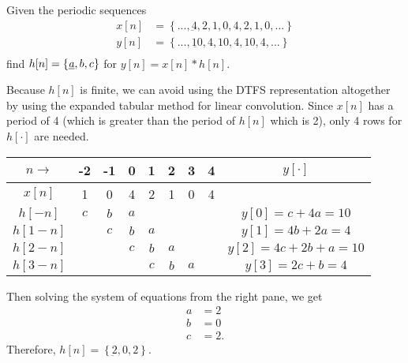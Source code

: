 \documentclass{report}
\begin{document}
\begin{example}
    Given the periodic sequences 
    \begin{align*}
        x[n] &= \left\{...,\underbar{4},2,1,0,4,2,1,0,...\right\} \\
        y[n] &= \left\{...,\underbar{10},4,10,4,10,4,...\right\} \\
    \end{align*}
    find $h[n]=\left\{\underbar{\emph{a}},b,c\right\}$ for $y[n]=x[n]*h[n]$.
\end{example}
\begin{solution}
    Because $h[n]$ is finite, we can avoid using the DTFS representation altogether by using the expanded tabular method for linear convolution. 
    Since $x[n]$ has a period of 4 (which is greater than the period of $h[n]$ which is 2), only 4 rows for $h[\cdot]$ are needed.
    \begin{center}
        \begin{tabular}{c|ccccccc|c}
            $n \rightarrow $ & -2 & -1 & 0 & 1 & 2 & 3 & 4 & $y[\cdot]$ \\
            \hline
            $x[n]$ & 1 & 0 & 4 & 2 & 1 & 0 & 4 & \\
            \hline
            $h[-n]$ & $c$ & $b$ & $a$ & & & & & $y[0] = c + 4a = 10$ \\
            $h[1-n]$ & & $c$ & $b$ & $a$ & & & & $y[1] = 4b + 2a = 4$ \\
            $h[2-n]$ & & & $c$ & $b$ & $a$ & & & $y[2] = 4c + 2b + a = 10$\\
            $h[3-n]$ & & & & $c$ & $b$ & $a$ & & $y[3] = 2c + b = 4$
        \end{tabular}
    \end{center}
    Then solving the system of equations from the right pane, we get 
    \begin{align*}
        a &= 2 \\
        b &= 0 \\
        c &= 2.
    \end{align*}
    Therefore, $h[n]=\left\{\underbar{2},0,2\right\}$.
\end{solution}
\end{document}
